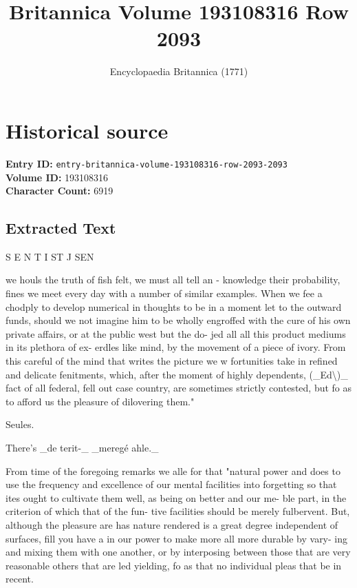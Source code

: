 \documentclass{article}
\title{Britannica Volume 193108316 Row 2093}
\date{Encyclopaedia Britannica (1771)}
\begin{document}
\maketitle

\section*{Historical source}
\textbf{Entry ID:} \texttt{entry-britannica-volume-193108316-row-2093-2093} \\
\textbf{Volume ID:} 193108316 \\
\textbf{Character Count:} 6919

\subsection*{Extracted Text}
S E N T I ST J SEN

we houls the truth of fish felt, we must all tell an -
knowledge their probability, fines we meet every day with a number of similar examples. When we fee a
chodply to develop numerical in thoughts to be in a
moment let to the outward funds, should we not imagine him to be wholly engroffed with the cure of his own private affairs, or at the public west but the do-
jed all all this product mediums in its plethora of ex-
erdles like mind, by the movement of a piece of ivory. From this careful of the mind that writes the picture we
w fortunities take in refined and delicate fenitments, which, after the moment of highly dependents, (\_Ed\textbackslash{})\_
fact of all federal, fell out case country, are sometimes strictly contested, but fo as to afford us the pleasure of dilovering them."

Seules.

There’s \_de terit-\_
\_meregé ahle.\_

From time of the foregoing remarks we alle for that "natural power and does to use the frequency and excellence of our mental facilities into forgetting so that ites ought to cultivate them well, as being on better and our me-
ble part, in the criterion of which that of the fun-
tive facilities should be merely fulbervent. But, although the pleasure are has nature rendered is a great degree independent of surfaces, fill you have a in our power to make more all more durable by vary-
ing and mixing them with one another, or by interposing between those that are very reasonable others that are led yielding, fo as that no individual pleas that be in recent.
\end{document}
